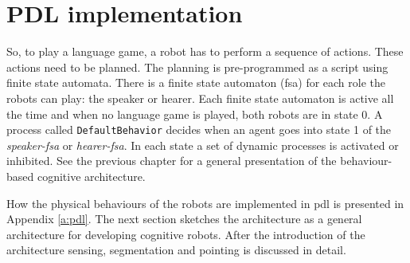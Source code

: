 \section{PDL implementation}

So, to play a language game, a robot has to perform a sequence of actions. These actions need to be planned. The planning is pre-programmed as a script using finite state automata. There is a finite state automaton ({\sc fsa}) for each role the robots can play: the speaker or hearer. Each finite state automaton is active all the time and when no language game is played, both robots are in state 0. A process called \texttt{DefaultBehavior} decides when an agent goes into state 1 of the {\em speaker-{\sc fsa}} or {\em hearer-{\sc fsa}}. In each state a set of dynamic processes is activated or inhibited. See the previous chapter for a general presentation of the behaviour-based cognitive architecture.

How the physical behaviours of the robots are implemented in {\sc pdl} is presented in Appendix \ref{a:pdl}. The next section sketches the architecture as a general architecture for developing cognitive robots. After the introduction of the architecture sensing, segmentation and pointing is discussed in detail.


